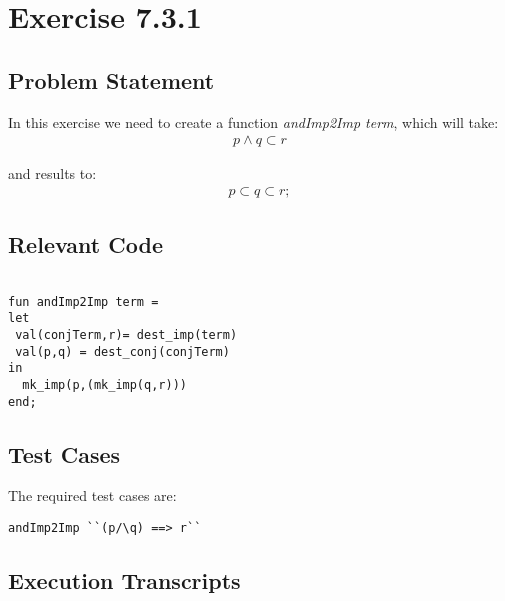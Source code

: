 \documentclass{report}
\begin{document}

 \chapter{Exercise 7.3.1}
 \label{cha:exercise-7.3.1}
  
 \section{Problem Statement}
 \label{sec:problem-statement-1}

In this exercise we need to create a function \emph{andImp2Imp term}, which will take:
\begin{align*}
p\wedge q \subset r
\end{align*}

and results to:
\begin{align*}
p \subset q \subset r;
\end{align*}

\section{Relevant Code}
\label{sec:relevant-code-1}
 \lstset{frameround=fftt}
\begin{lstlisting}[frame=tRBL]

fun andImp2Imp term =
let
 val(conjTerm,r)= dest_imp(term)
 val(p,q) = dest_conj(conjTerm)
in
  mk_imp(p,(mk_imp(q,r)))
end;

\end{lstlisting}

\section{Test Cases}
\label{sec:test-cases-1}

The required test cases are:
\begin{lstlisting}[frame = tRBL ]
andImp2Imp ``(p/\q) ==> r``
\end{lstlisting}

\section{Execution Transcripts}
\label{sec:exec-transcr-1}
\end{document}
